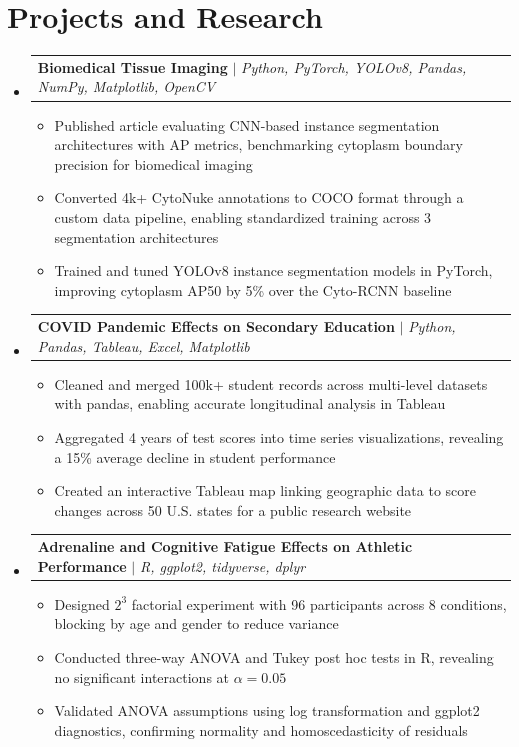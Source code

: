 \documentclass[letterpaper,11pt]{article}
\makeatletter
\newcommand{\resumeItem}[1]{
  \item\small{#1}
}
\newcommand{\resumeProjectHeading}[2]{
    \item
    \begin{tabular*}{\textwidth}{l@{\extracolsep{\fill}}r}
      #1 & #2 \\
    \end{tabular*}\vspace{-7pt}
}
\newcommand{\resumeSubHeadingListStart}{\begin{itemize}[leftmargin=0in, label={}]}
\newcommand{\resumeSubHeadingListEnd}{\end{itemize}}
\newcommand{\resumeItemListStart}{\begin{itemize}[itemsep= 1.5pt, parsep=0pt]}
\newcommand{\resumeItemListEnd}{\end{itemize}\vspace{-5pt}}
\makeatother
\begin{document}
\section{Projects and Research}
    \resumeSubHeadingListStart
      \resumeProjectHeading
          {\textbf{Biomedical Tissue Imaging} $|$ \textit{Python, PyTorch, YOLOv8, Pandas, NumPy, Matplotlib, OpenCV}}{}
          \resumeItemListStart
            \resumeItem{Published article evaluating CNN-based instance segmentation architectures with AP metrics, benchmarking cytoplasm boundary precision for biomedical imaging}
            \resumeItem{Converted 4k+ CytoNuke annotations to COCO format through a custom data pipeline, enabling standardized training across 3 segmentation architectures}
            \resumeItem{Trained and tuned YOLOv8 instance segmentation models in PyTorch, improving cytoplasm AP50 by 5\% over the Cyto-RCNN baseline}
          \resumeItemListEnd
      \resumeProjectHeading
          {\textbf{COVID Pandemic Effects on Secondary Education} $|$ \textit{Python, Pandas, Tableau, Excel, Matplotlib}}{}
          \resumeItemListStart
            \resumeItem{Cleaned and merged 100k+ student records across multi-level datasets with pandas, enabling accurate longitudinal analysis in Tableau}
            \resumeItem{Aggregated 4 years of test scores into time series visualizations, revealing a 15\% average decline in student performance}
            \resumeItem{Created an interactive Tableau map linking geographic data to score changes across 50 U.S. states for a public research website}
          \resumeItemListEnd
      \resumeProjectHeading
          {\textbf{Adrenaline and Cognitive Fatigue Effects on Athletic Performance} $|$ \textit{R, ggplot2, tidyverse, dplyr}}{}
          \resumeItemListStart
            \resumeItem{Designed $2^3$ factorial experiment with 96 participants across 8 conditions, blocking by age and gender to reduce variance}
            \resumeItem{Conducted three-way ANOVA and Tukey post hoc tests in R, revealing no significant interactions at $\alpha = 0.05$}
            \resumeItem{Validated ANOVA assumptions using log transformation and ggplot2 diagnostics, confirming normality and homoscedasticity of residuals}
          \resumeItemListEnd
    \resumeSubHeadingListEnd
\end{document}
